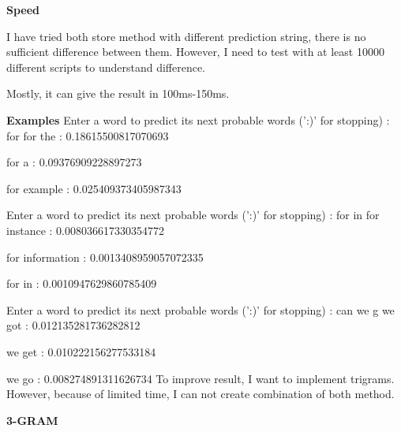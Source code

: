 \documentclass[11pt]{article}
\begin{document}
\textbf{Speed}

I have tried both store method with different prediction string, there
is no sufficient difference between them. However, I need to test with
at least 10000 different scripts to understand difference.

Mostly, it can give the result in 100ms-150ms.

    \textbf{Examples}
Enter a word to predict its next probable words (':)' for stopping) : for
for the : 0.18615500817070693

for a : 0.09376909228897273

for example : 0.025409373405987343

Enter a word to predict its next probable words (':)' for stopping) : for in
for instance : 0.008036617330354772

for information : 0.0013408959057072335

for in : 0.0010947629860785409

Enter a word to predict its next probable words (':)' for stopping) : can we g
we got : 0.012135281736282812

we get : 0.010222156277533184

we go : 0.008274891311626734
    To improve result, I want to implement trigrams. However, because of
limited time, I can not create combination of both method.

    \textbf{3-GRAM}
\end{document}
